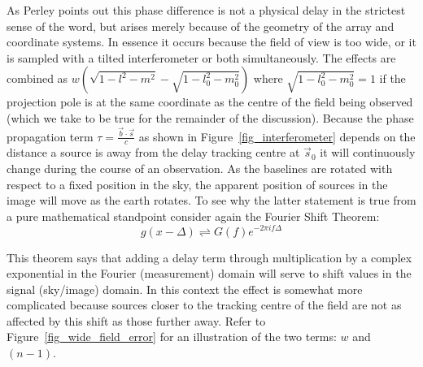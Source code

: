 As Perley \cite[Lecture 19]{taylor1999synthesis} points out this phase difference is not a physical delay in the strictest sense of the word, but arises merely because of the 
geometry of the array and coordinate systems. In essence it occurs because the field of view is too wide, or it is sampled with a tilted interferometer or both simultaneously. The effects 
are combined as $w(\sqrt{1-l^2-m^2} - \sqrt{1-l_0^2-m_0^2})$ where $\sqrt{1-l_0^2-m_0^2} = 1$ if the projection pole is at the same coordinate as the centre
of the field being observed (which we take to be true for the remainder of the discussion). Because the phase propagation term $\tau = \frac{\vec{b}\cdot\vec{s}}{c}$ as 
shown in Figure~\ref{fig_interferometer} depends on the distance a source is away from the delay tracking centre at $\vec{s}_0$ it will continuously change during the course 
of an observation. As the baselines are rotated with respect to a fixed position in the sky, the apparent position of sources in the image will move as the earth rotates. To see why 
the latter statement is true from a pure mathematical standpoint consider again the Fourier Shift Theorem:
\begin{equation}
 g(x-\Delta) \rightleftharpoons G(f)e^{-2\pi if\Delta}
\end{equation}

This theorem says that adding a delay term through multiplication by a complex exponential in the Fourier (measurement) domain will serve to shift values in the 
signal (sky/image) domain. In this context the effect is somewhat more complicated because sources closer to the tracking centre of the field are not as affected 
by this shift as those further away. Refer to Figure~\ref{fig_wide_field_error} for an illustration of the two terms: $w$ and $(n-1)$.

